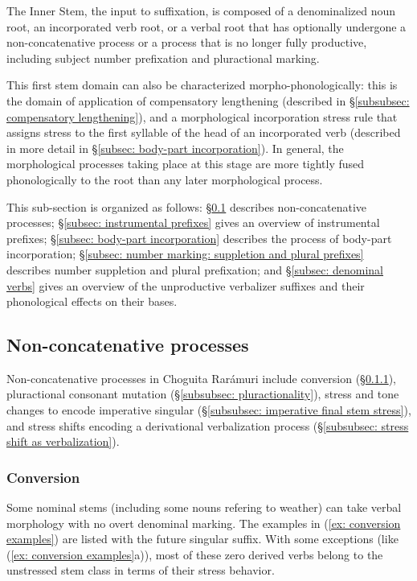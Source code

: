 The Inner Stem, the input to suffixation, is composed of a denominalized noun root, an incorporated verb root, or a verbal root that has optionally undergone a non-concatenative process or a process that is no longer fully productive, including subject number prefixation and pluractional marking.


This first stem domain can also be characterized morpho-phonologically: this is the domain of application of compensatory lengthening (described in §\ref{subsubsec: compensatory lengthening}), and a morphological incorporation stress rule that assigns stress to the first syllable of the head of an incorporated verb (described in more detail in §\ref{subsec: body-part incorporation}). In general, the morphological processes taking place at this stage are more tightly fused phonologically to the root than any later morphological process.

This sub-section is organized as follows: §\ref{subsec: non-concatenative processes} describes non-concatenative processes; §\ref{subsec: instrumental prefixes} gives an overview of instrumental prefixes; §\ref{subsec: body-part incorporation} describes the process of body-part incorporation; §\ref{subsec: number marking: suppletion and plural prefixes} describes number suppletion and plural prefixation; and §\ref{subsec: denominal verbs} gives an overview of the unproductive verbalizer suffixes and their phonological effects on their bases.

\subsection{Non-concatenative processes}
\label{subsec: non-concatenative processes}

Non-concatenative processes in Choguita Rarámuri include conversion (§\ref{subsubsec: conversion}), pluractional consonant mutation (§\ref{subsubsec: pluractionality}), stress and tone changes to encode imperative singular (§\ref{subsubsec: imperative final stem stress}), and stress shifts encoding a derivational verbalization process (§\ref{subsubsec: stress shift as verbalization}).


\subsubsection{Conversion}
\label{subsubsec: conversion}


Some nominal stems (including some nouns refering to weather) can take verbal morphology with no overt denominal marking. The examples in (\ref{ex: conversion examples}) are listed with the future singular suffix. With some exceptions (like (\ref{ex: conversion examples}a)), most of these zero derived verbs belong to the unstressed stem class in terms of their stress behavior.


